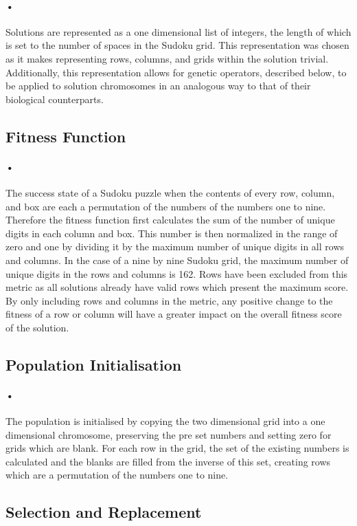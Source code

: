\documentclass[10pt]{article}
\begin{document}
\paragraph{•}
Solutions are represented as a one dimensional list of integers, the length of which is set to the number of spaces in the Sudoku grid. This representation was chosen as it makes representing rows, columns, and grids within the solution trivial. Additionally, this representation allows for genetic operators, described below, to be applied to solution chromosomes in an analogous way to that of their biological counterparts. 
\subsection{Fitness Function}
\paragraph{•}
The success state of a Sudoku puzzle when the contents of every row, column, and box are each a permutation of the numbers of the numbers one to nine. Therefore the fitness function first calculates the sum of the number of unique digits in each column and box. This number is then normalized in the range of zero and one by dividing it by the maximum number of unique digits in all rows and columns. In the case of a nine by nine Sudoku grid, the maximum number of unique digits in the rows and columns is 162. Rows have been excluded from this metric as all solutions already have valid rows which present the maximum score. By only including rows and columns in the metric, any positive change to the fitness of a row or column will have a greater impact on the overall fitness score of the solution.
\subsection{Population Initialisation}
\paragraph{•}
The population is initialised by copying the two dimensional grid into a one dimensional chromosome, preserving the pre set numbers and setting zero for grids which are blank. For each row in the grid, the set of the existing numbers is calculated and the blanks are filled from the inverse of this set, creating rows which are a permutation of the numbers one to nine.
\subsection{Selection and Replacement}
\end{document}
